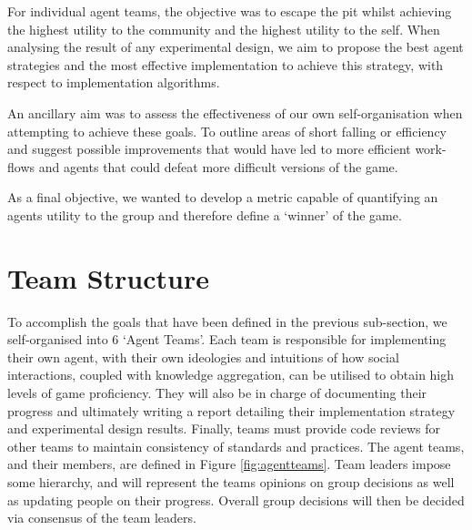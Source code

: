 For individual agent teams, the objective was to escape the pit whilst achieving the highest utility to the community and the highest utility to the self. When analysing the result of any experimental design, we aim to propose the best agent strategies and the most effective implementation to achieve this strategy, with respect to implementation algorithms. 

An ancillary aim was to assess the effectiveness of our own self-organisation when attempting to achieve these goals. To outline areas of short falling or efficiency and suggest possible improvements that would have led to more efficient work-flows and agents that could defeat more difficult versions of the game. 

As a final objective, we wanted to develop a metric capable of quantifying an agents utility to the group and therefore define a `winner' of the game. 



\section{Team Structure}\label{sec:team struct}

To accomplish the goals that have been defined in the previous sub-section, we self-organised into 6 `Agent Teams'. Each team is responsible for implementing their own agent, with their own ideologies and intuitions of how social interactions, coupled with knowledge aggregation, can be utilised to obtain high levels of game proficiency. They will also be in charge of documenting their progress and ultimately writing a report detailing their implementation strategy and experimental design results. Finally, teams must provide code reviews for other teams to maintain consistency of standards and practices. The agent teams, and their members, are defined in Figure \ref{fig:agentteams}. Team leaders impose some hierarchy, and will represent the teams opinions on group decisions as well as updating people on their progress. Overall group decisions will then be decided via consensus of the team leaders. 


